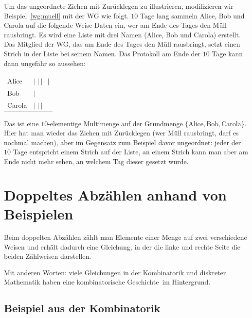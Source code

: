 \begin{bsp}
	Um das ungeordnete Ziehen mit Zurücklegen zu illustrieren, modifizieren wir  Beispiel~\ref{wg:muell} mit der WG wie folgt. $10$ Tage lang sammeln Alice, Bob und Carola auf die folgende Weise Daten ein, wer am Ende des Tages den Müll rausbringt. Es wird eine Liste mit drei Namen (Alice, Bob und Carola) erstellt. Das Mitglied der WG, das am Ende des Tages den Müll rausbringt, setzt einen Strich in der Liste bei seinem Namen. Das Protokoll am Ende der $10$ Tage kann dann ungefähr so aussehen: 
	\begin{center}
	\begin{tabular}{ll}
			Alice & $| \  | \ | \  | \ | $ 
			\\ Bob &  $| $ 
			\\ Carola & $| \ | \  | \  |$ 
	\end{tabular} 
	\end{center} 
	
	
	Das ist eine $10$-elementige Multimenge auf der Grundmenge $\{ \text{Alice}, \text{Bob}, \text{Carola}\}$.  Hier hat man wieder das Ziehen mit Zurücklegen (wer Müll rausbringt, darf es nochmal machen), aber im Gegensatz zum Beispiel davor ungeordnet: jeder der $10$ Tage entspricht einem Strich auf der Liste, an einem Strich kann man aber am Ende nicht mehr sehen, an welchem Tag dieser gesetzt wurde. 
\end{bsp} 

\section{Doppeltes Abzählen anhand von Beispielen} 

\begin{bem}
	Beim doppelten Abzählen zählt man Elemente einer Menge auf zwei verschiedene Weisen und erhält dadurch eine Gleichung, in der die linke und rechte Seite die beiden Zählweisen darstellen. 
	
	Mit anderen Worten: viele Gleichungen in der Kombinatorik und diskreter Mathematik haben eine kombinatorische \glqq Geschichte\grqq\ im Hintergrund. 
\end{bem} 

\subsection{Beispiel aus der Kombinatorik}

